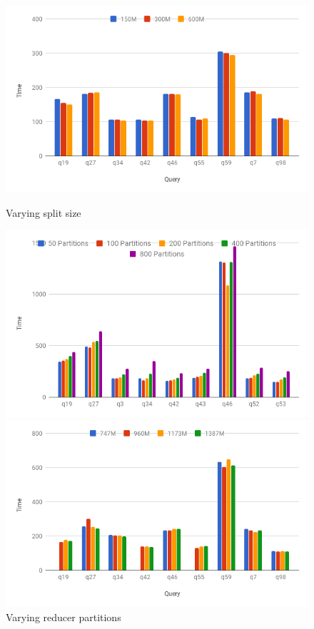 \begin{figure}[ht]
  \includegraphics[width=\linewidth]{fig/varysplitsize.png}
  \caption{Varying split size \protect\footnotemark[1]}\label{fig:varysplitsize}
\endminipage\hfill
{}
  \includegraphics[width=\linewidth]{fig/varyreducers.png}
  \caption{Varying reducer partitions \protect\footnotemark[1]}\label{fig:varyreducers}
\endminipage\hfill
{}%
  \includegraphics[width=\linewidth]{fig/varymem.png}

\end{figure}
